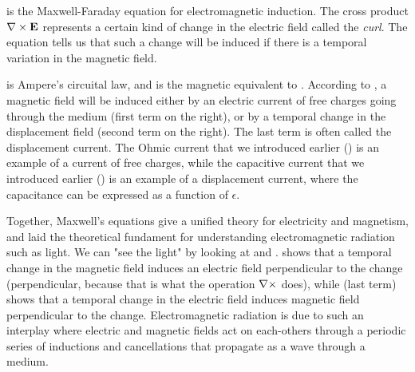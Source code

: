  is the Maxwell-Faraday equation for electromagnetic induction. The cross product ${\bf \nabla} \times {\bf E}$ represents a certain kind of change in the electric field called the \textit{curl}. The equation tells us that such a change will be induced if there is a temporal variation in the magnetic field.

 is Ampere's circuital law, and is the magnetic equivalent to . According to , a magnetic field will be induced either by an electric current of free charges going through the medium (first term on the right), or by a temporal change in the displacement field (second term on the right). The last term is often called the displacement current. The Ohmic current that we introduced earlier () is an example of a current of free charges, while the capacitive current that we introduced earlier () is an example of a displacement current, where the capacitance can be expressed as a function of $\epsilon$.

Together, Maxwell's equations give a unified theory for electricity and magnetism, and laid the theoretical fundament for understanding electromagnetic radiation such as light. We can "see the light" by looking at  and .  shows that a temporal change in the magnetic field induces an electric field perpendicular to the change (perpendicular, because that is what the operation ${\bf \nabla} \times$ does), while  (last term) shows that a temporal change in the electric field induces magnetic field perpendicular to the change. Electromagnetic radiation is due to such an interplay where electric and magnetic fields act on each-others  through a periodic series of inductions and cancellations that propagate as a wave through a medium.

